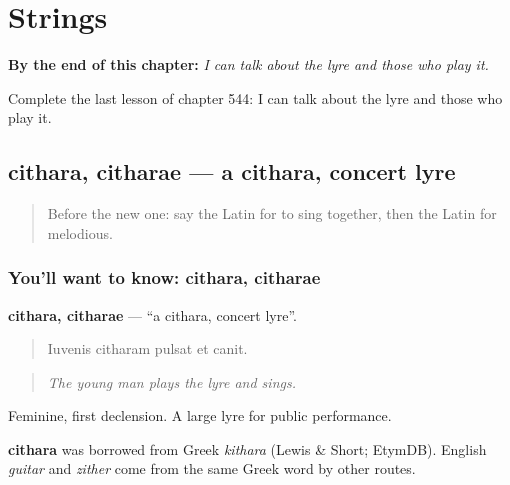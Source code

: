 
\chapter{Strings}
\label{ch:la-strings}

\begin{chapteropening}
\textbf{By the end of this chapter:} \emph{I can talk about the lyre and those who play it.}

Complete the last lesson of chapter 544: I can talk about the lyre and those who play it.
\end{chapteropening}

\section[cithara, citharae]{cithara, citharae — a cithara, concert lyre}

\label{lesson:LA-C544-cithara}



\begin{quote}
Before the new one: say the Latin for to sing together, then the Latin for melodious.
\end{quote}

\subsection*{You'll want to know: cithara, citharae}
\textbf{cithara, citharae} — \textquotedblleft{}a cithara, concert lyre\textquotedblright{}.

\begin{quote}
Iuvenis citharam pulsat et canit.
\end{quote}

\begin{quote}
\emph{The young man plays the lyre and sings.}
\end{quote}

Feminine, first declension. A large lyre for public performance.

\begin{cousinweb}
\textbf{cithara} was borrowed from Greek \emph{kithara} (Lewis \& Short; EtymDB). English \emph{guitar} and \emph{zither} come from the same Greek word by other routes.
\end{cousinweb}

